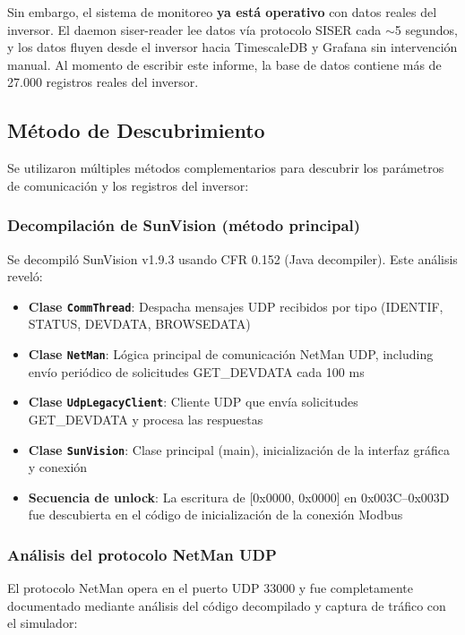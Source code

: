 \documentclass[12pt,a4paper]{article}
\begin{document}
Sin embargo, el sistema de monitoreo \textbf{ya est\'a operativo} con datos reales del inversor. El daemon siser-reader lee datos v\'ia protocolo SISER cada $\sim$5 segundos, y los datos fluyen desde el inversor hacia TimescaleDB y Grafana sin intervenci\'on manual. Al momento de escribir este informe, la base de datos contiene m\'as de 27.000 registros reales del inversor.

\subsection{M\'etodo de Descubrimiento}

Se utilizaron m\'ultiples m\'etodos complementarios para descubrir los par\'ametros de comunicaci\'on y los registros del inversor:

\subsubsection{Decompilaci\'on de SunVision (m\'etodo principal)}

Se decompil\'o SunVision v1.9.3 usando CFR 0.152 (Java decompiler). Este an\'alisis revel\'o:

\begin{itemize}
    \item \textbf{Clase \texttt{CommThread}}: Despacha mensajes UDP recibidos por tipo (IDENTIF, STATUS, DEVDATA, BROWSEDATA)
    \item \textbf{Clase \texttt{NetMan}}: L\'ogica principal de comunicaci\'on NetMan UDP, including env\'io peri\'odico de solicitudes GET\_DEVDATA cada 100 ms
    \item \textbf{Clase \texttt{UdpLegacyClient}}: Cliente UDP que env\'ia solicitudes GET\_DEVDATA y procesa las respuestas
    \item \textbf{Clase \texttt{SunVision}}: Clase principal (main), inicializaci\'on de la interfaz gr\'afica y conexi\'on
    \item \textbf{Secuencia de unlock}: La escritura de [0x0000, 0x0000] en 0x003C--0x003D fue descubierta en el c\'odigo de inicializaci\'on de la conexi\'on Modbus
\end{itemize}

\subsubsection{An\'alisis del protocolo NetMan UDP}

El protocolo NetMan opera en el puerto UDP 33000 y fue completamente documentado mediante an\'alisis del c\'odigo decompilado y captura de tr\'afico con el simulador:
\end{document}
